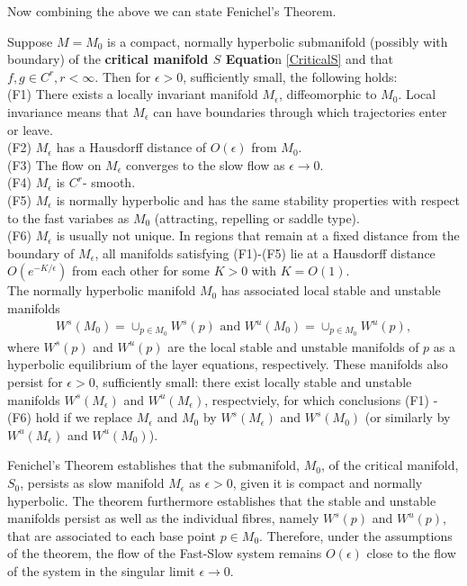 Now combining the above we can state Fenichel's Theorem.

\begin{theorem} \label{Fenichel}	
	Suppose $M=M_0$ is a compact, normally hyperbolic submanifold  (possibly with boundary) of the \textbf{critical manifold $S$ Equatio}n \ref{CriticalS} 	and  that $f, g \in C^r, r < \infty $. Then for $\epsilon >0$, sufficiently small, the following holds:\\
	(F1) There exists a locally invariant manifold $M_{\epsilon}$, diffeomorphic to  $M_0$. Local invariance means that $M_{\epsilon}$ can have boundaries through which trajectories enter or leave.\\
	(F2) $M_{\epsilon}$ has a Hausdorff distance of $O(\epsilon)$ from $M_0$.\\
	(F3) The flow on $M_{\epsilon}$  converges to the slow flow as $\epsilon \to 0$.\\
	(F4) $M_{\epsilon}$ is $C^r$- smooth.\\
	(F5) $M_{\epsilon}$ is normally hyperbolic and has the same stability properties with respect to the fast variabes as $M_0$ (attracting, repelling or saddle type).\\
	(F6) $M_{\epsilon}$ is usually not unique. In regions that remain at a fixed distance from the boundary of  $M_{\epsilon}$, all manifolds satisfying (F1)-(F5) lie at a Hausdorff distance $O(e^{-K/\epsilon})$ from each other for some $K>0$ with $K=O(1)$.\\
	The normally hyperbolic manifold $M_0$ has associated local stable and unstable manifolds
	\begin{align*}
	W^s(M_0) =\cup_{p \in M_0} W^s(p) \textrm{\ \ and\ \ } W^u(M_0) =\cup_{p \in M_0} W^u(p),
	\end{align*}
	where  $W^s(p)$ and $W^u(p)$ are the local stable and unstable manifolds of $p$ as a hyperbolic equilibrium of the layer equations, respectively. These manifolds also persist for $\epsilon > 0$, sufficiently small: there exist locally stable and unstable manifolds $W^s(M_\epsilon)$ and $W^u(M_\epsilon)$, respectviely, for which conclusions (F1) - (F6) hold if we replace $M_\epsilon$ and $M_0$ by  $W^s(M_\epsilon)$ and $W^s(M_0)$ (or similarly by  $W^u(M_\epsilon)$ and $W^u(M_0)$).
\end{theorem} 
Fenichel's Theorem establishes that the submanifold, $M_0$, of the critical manifold, $S_0$, persists as slow manifold $M_\epsilon$ as $\epsilon >0$, given it is compact and normally hyperbolic. The theorem furthermore establishes that the stable and unstable manifolds persist as well as the individual fibres, namely $W^s(p)$ and $W^u(p)$, that are associated to each base point $p \in M_0$.
Therefore, under the assumptions of the theorem, the flow of the Fast-Slow system remains $O(\epsilon)$ close to the flow of the system in the singular limit $\epsilon \to 0$.\\

